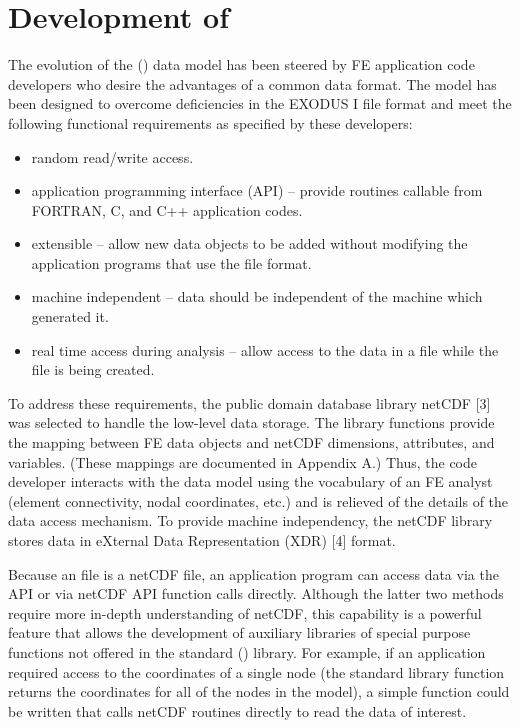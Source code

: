 \chapter{Development of \exo{}}


The evolution of the \exo() data model has been steered by
FE application code developers who desire the advantages of a
common data format. The \exo{} model has been designed to
overcome deficiencies in the EXODUS I file format and meet the
following functional requirements as specified by these developers:

\begin{itemize}
 \item random read/write access.

 \item application programming interface (API) -- provide
routines callable from FORTRAN, C, and C++ application codes.

 \item extensible -- allow new data objects to be added
without modifying the application programs that use the file
format.

 \item {machine independent -- data should be independent
of the machine which generated it.}

 \item {real time access during analysis -- allow access
to the data in a file while the file is being created.}
\end{itemize}


To address these requirements, the public domain database library
netCDF [3] was selected to handle the low-level data storage. The
\exo{} library functions provide the mapping between FE data objects
and netCDF dimensions, attributes, and variables. (These mappings are
documented in Appendix A.) Thus, the code developer interacts with the
data model using the vocabulary of an FE analyst (element
connectivity, nodal coordinates, etc.) and is relieved of the details
of the data access mechanism. To provide machine independency, the
netCDF library stores data in eXternal Data Representation (XDR) [4]
format.


Because an \exo{} file is a netCDF file, an application program can
access data via the \exo{} API or via netCDF API function calls
directly. Although the latter two methods require more in-depth
understanding of netCDF, this capability is a powerful
feature that allows the development of auxiliary libraries of special
purpose functions not offered in the standard \exo() library. For
example, if an application required access to the coordinates of a
single node (the standard library function returns the coordinates for
all of the nodes in the model), a simple function could be written
that calls netCDF routines directly to read the data of interest.
